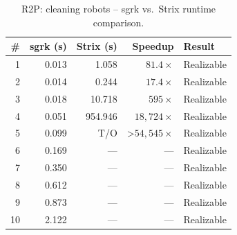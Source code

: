\begin{table}[htbp]
\centering
\caption{R2P: cleaning robots -- sgrk vs.\ Strix runtime comparison.}
\label{tab:R2P_cleaning_robots}
\begin{tabular}{r r r r l}
\toprule
\# & sgrk (s) & Strix (s) & Speedup & Result \\
\midrule
1 & 0.013 & 1.058 & $81.4\times$ & Realizable \\
2 & 0.014 & 0.244 & $17.4\times$ & Realizable \\
3 & 0.018 & 10.718 & $595\times$ & Realizable \\
4 & 0.051 & 954.946 & $18,724\times$ & Realizable \\
5 & 0.099 & T/O & >$54,545\times$ & Realizable \\
6 & 0.169 & --- & --- & Realizable \\
7 & 0.350 & --- & --- & Realizable \\
8 & 0.612 & --- & --- & Realizable \\
9 & 0.873 & --- & --- & Realizable \\
10 & 2.122 & --- & --- & Realizable \\
\bottomrule
\end{tabular}
\end{table}

